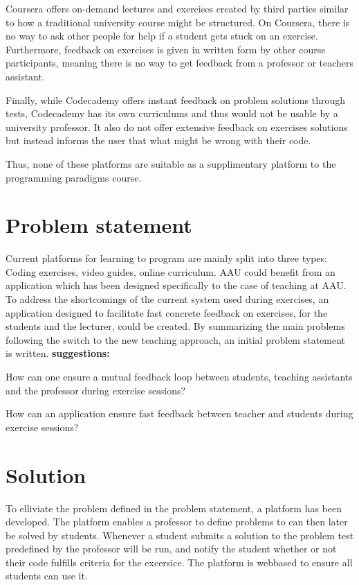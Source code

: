 Coursera offers on-demand lectures and exercises created by third parties similar to how a traditional university course might be structured.
On Coursera, there is no way to ask other people for help if a student gets stuck on an exercise.
Furthermore, feedback on exercises is given in written form by other course participants, meaning there is no way to get feedback from a professor or teachers assistant. 


Finally, while Codecademy offers instant feedback on problem solutions through tests, Codecademy has its own curriculums and thus would not be usable by a university professor. 
It also do not offer extensive feedback on exercises solutions but instead informs the user that what might be wrong with their code. 


Thus, none of these platforms are suitable as a supplimentary platform to the programming paradigms course. 
\section{Problem statement}
Current platforms for learning to program are mainly split into three types: Coding exercises, video guides, online curriculum. 
AAU could benefit from an application which has been designed specifically to the case of teaching at AAU.
To address the shortcomings of the current system used during exercises, an application designed to facilitate fast concrete feedback on exercises, for the students and the lecturer, could be created.
By summarizing the main problems following the switch to the new teaching approach, an initial problem statement is written.
\textbf{suggestions:}
\begin{displayquote}
How can one ensure a mutual feedback loop between students, teaching assistants and the professor during exercise sessions?
\end{displayquote} 

\begin{displayquote}
    How can an application ensure fast feedback between teacher and students during exercise sessions?
\end{displayquote} 

\section{Solution}
To elliviate the problem defined in the problem statement, a platform has been developed.
The platform enables a professor to define problems to can then later be solved by students.
Whenever a student submits a solution to the problem test predefined by the professor will be run, and notify the student whether or not their code fulfills criteria for the excersice. 
The platform is webbased to ensure all students can use it.